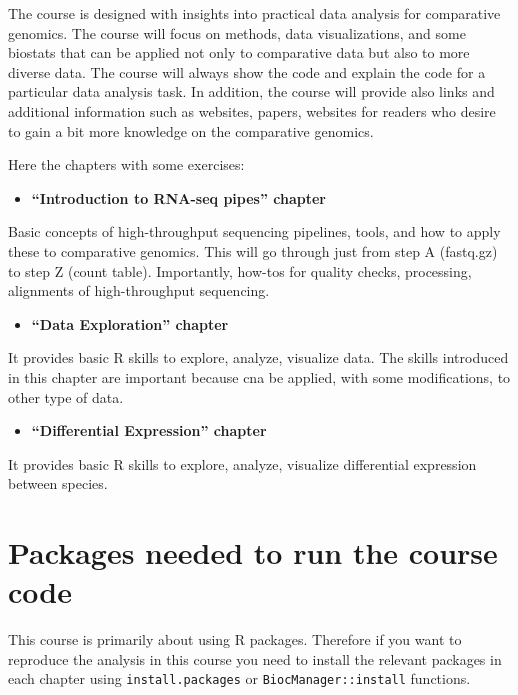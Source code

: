 \documentclass[]{book}
\providecommand{\tightlist}{%
  \setlength{\itemsep}{0pt}\setlength{\parskip}{0pt}}
\begin{document}
The course is designed with insights into practical data analysis for comparative genomics. The course will focus on methods, data visualizations, and some biostats that can be applied not only to comparative data but also to more diverse data. The course will always show the code and explain the code for a particular data analysis task.
In addition, the course will provide also links and additional information such as websites, papers, websites for readers who desire to gain a bit more knowledge on the comparative genomics.

Here the chapters with some exercises:

\begin{itemize}
\tightlist
\item
  \textbf{``Introduction to RNA-seq pipes'' chapter}
\end{itemize}

Basic concepts of high-throughput sequencing pipelines, tools, and how to apply these to comparative genomics. This will go through just from step A (fastq.gz) to step Z (count table). Importantly, how-tos for quality checks, processing, alignments of high-throughput sequencing.

\begin{itemize}
\tightlist
\item
  \textbf{``Data Exploration'' chapter}
\end{itemize}

It provides basic R skills to explore, analyze, visualize data. The skills introduced in this chapter are important because cna be applied, with some modifications, to other type of data.

\begin{itemize}
\tightlist
\item
  \textbf{``Differential Expression'' chapter}
\end{itemize}

It provides basic R skills to explore, analyze, visualize differential expression between species.

\hypertarget{packages-needed-to-run-the-course-code}{%
\section*{Packages needed to run the course code}\label{packages-needed-to-run-the-course-code}}

This course is primarily about using R packages. Therefore if you want to reproduce the analysis in this course you need to install the relevant packages in each chapter using \texttt{install.packages} or \texttt{BiocManager::install} functions.
\end{document}
